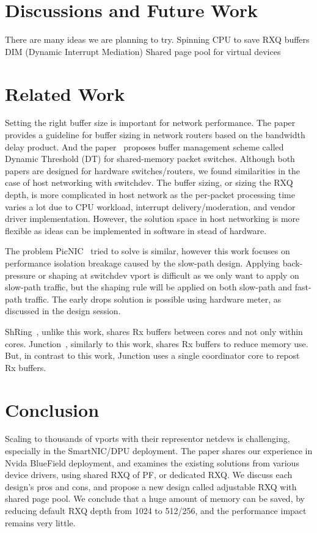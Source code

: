 \documentclass[letterpaper]{article}
\begin{document}
\section{Discussions and Future Work}
There are many ideas we are planning to try.
Spinning CPU to save RXQ buffers
DIM (Dynamic Interrupt Mediation) 
Shared page pool for virtual devices


\section{Related Work}
Setting the right buffer size is important for network performance.
The paper~\cite{buffersize} provides a guideline for buffer sizing
in network routers based on the bandwidth delay product.
And the paper~\cite{queuelength} proposes buffer management scheme
called Dynamic Threshold (DT) for shared-memory packet switches.
Although both papers are designed for hardware switches/routers,
we found similarities in the case of host networking with switchdev.
The buffer sizing, or sizing the RXQ depth, is more complicated in host
network as the per-packet processing time varies a lot due to CPU workload,
interrupt delivery/moderation, and vendor driver implementation.
However, the solution space in host networking is more flexible as
ideas can be implemented in software in stead of hardware.

The problem PicNIC~\cite{picnic} tried to solve is similar, however this
work focuses on performance isolation breakage caused by the slow-path
design. Applying back-pressure or shaping at switchdev vport is difficult
as we only want to apply on slow-path traffic, but the shaping rule will
be applied on both slow-path and fast-path traffic. The early drops solution
is possible using hardware meter, as discussed in the design session.

ShRing~\cite{shring}, unlike this work, shares Rx buffers between cores and
not only within cores. Junction~\cite{junction}, similarly to this work,
shares Rx buffers to reduce memory use. But, in contrast to this work,
Junction uses a single coordinator core to repost Rx buffers.

\section{Conclusion}
Scaling to thousands of vports with their representor netdevs is challenging,
especially in the SmartNIC/DPU deployment. The paper shares our experience in
Nvida BlueField deployment, and examines the existing
solutions from various device drivers, using shared RXQ of PF, or dedicated
RXQ. We discuss each design's pros and cons, and propose a new design called
adjustable RXQ with shared page pool. We conclude that a huge amount of memory can be saved,
by reducing default RXQ depth from 1024 to 512/256, and the performance impact
remains very little.
\end{document}
